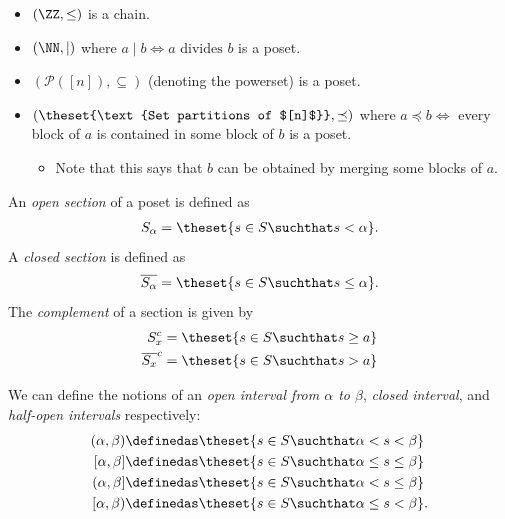 \begin{example}

\hfill

\begin{itemize}
\tightlist
\item
  \((\ZZ, \leq)\) is a chain.
\item
  \((\NN, \mid)\) where \(a\mid b \iff a\text{ divides } b\) is a poset.
\item
  \((\mathcal{P}([n]), \subseteq)\) (denoting the powerset) is a poset.
\item
  \((\theset{\text{Set partitions of $[n]$}}, \preceq)\) where
  \(a \preceq b \iff\) every block of \(a\) is contained in some block
  of \(b\) is a poset.

  \begin{itemize}
  \tightlist
  \item
    Note that this says that \(b\) can be obtained by merging some
    blocks of \(a\).
  \end{itemize}
\end{itemize}

\end{example}

\begin{definition}

An \emph{open section} of a poset is defined as
\begin{align*}S_\alpha = \theset{s \in S \suchthat s < \alpha}.\end{align*}
A \emph{closed section} is defined as
\begin{align*}\overline{S_\alpha} = \theset{s \in S \suchthat s \leq \alpha}.\end{align*}
The \emph{complement} of a section is given by
\begin{align*}
S_x^c = \theset{s\in S \suchthat s \geq a} \\
\overline{S_x}^c = \theset{s\in S \suchthat s > a}
\end{align*}

\end{definition}

\begin{definition}[Intervals]

We can define the notions of an \emph{open interval from \(\alpha\) to
\(\beta\)}, \emph{closed interval}, and \emph{half-open intervals}
respectively:
\begin{align*}
(\alpha, \beta) &\definedas \theset{s\in S \suchthat \alpha < s < \beta}\\
[\alpha, \beta] &\definedas \theset{s\in S \suchthat \alpha \leq s \leq \beta}\\
(\alpha, \beta] &\definedas \theset{s\in S \suchthat \alpha < s \leq \beta}\\
[\alpha, \beta) &\definedas \theset{s\in S \suchthat \alpha \leq s < \beta}.
\end{align*}

\end{definition}

